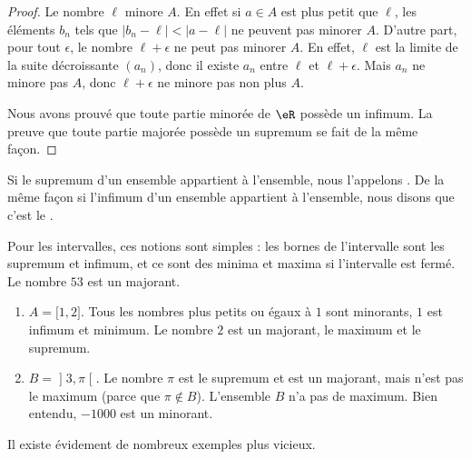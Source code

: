 \begin{proof}
	Le nombre $\ell$ minore $A$. En effet si $a\in A$ est plus petit que $\ell$, les éléments $b_n$ tels que $| b_n-\ell |<| a-\ell |$ ne peuvent pas minorer $A$. D'autre part, pour tout $\epsilon$, le nombre $\ell+\epsilon$ ne peut pas minorer $A$. En effet, $\ell$ est la limite de la suite décroissante $(a_n)$, donc il existe $a_n$ entre $\ell$ et $\ell+\epsilon$. Mais $a_n$ ne minore pas $A$, donc $\ell+\epsilon$ ne minore pas non plus $A$.

	Nous avons prouvé que toute partie minorée de $\eR$ possède un infimum. La preuve que toute partie majorée possède un supremum se fait de la même façon.
	
\end{proof}


\begin{definition}
	Si le supremum d'un ensemble appartient à l'ensemble, nous l'appelons . De la même façon si l'infimum d'un ensemble appartient à l'ensemble, nous disons que c'est le .
\end{definition}

\begin{example}
	Pour les intervalles, ces notions sont simples : les bornes de l'intervalle sont les supremum et infimum, et ce sont des minima et maxima si l'intervalle est fermé. Le nombre $53$ est un majorant.
	\begin{enumerate}
		\item
			$A=\mathopen[ 1 , 2 \mathclose]$. Tous les nombres plus petits ou égaux à $1$ sont minorants, $1$ est infimum et minimum. Le nombre $2$ est un majorant, le maximum et le supremum.
		\item
			$B=\mathopen] 3 , \pi \mathclose[$. Le nombre $\pi$ est le supremum et est un majorant, mais n'est pas le maximum (parce que $\pi\notin B$). L'ensemble $B$ n'a pas de maximum. Bien entendu, $-1000$ est un minorant.
	\end{enumerate}
\end{example}

Il existe évidement de nombreux exemples plus vicieux.

